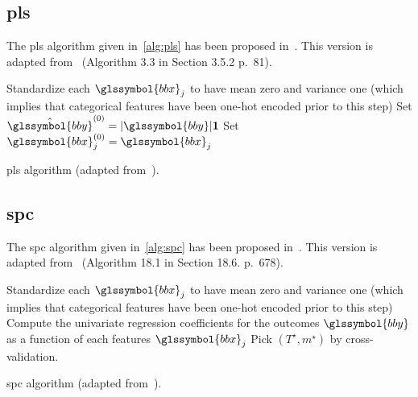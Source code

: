 \subsection{\gls{pls}} \label{app1:sec_pls}

The \gls{pls} algorithm given in~\eqref{alg:pls} has been proposed in~\cite{wold1984collinearity}. This version is adapted from~\cite{friedman2001elements} (Algorithm 3.3 in Section 3.5.2 p.\ 81).

\begin{algorithm}[H]
Standardize each $\glssymbol{bbx}_j$ to have mean zero and variance one (which implies that categorical features have been one-hot encoded prior to this step) \;
Set $\hat{\glssymbol{bby}}^{(0)} = |\glssymbol{bby}| \mathbf{1}$\;
Set $\glssymbol{bbx}_j^{(0)} = \glssymbol{bbx}_j$\;
 \caption{\label{alg:pls} \gls{pls} algorithm (adapted from~\cite{friedman2001elements}).}
\end{algorithm}


\subsection{\gls{spc}} \label{app1:sec_spc}

The \gls{spc} algorithm given in~\eqref{alg:spc} has been proposed in~\cite{bair2006prediction}. This version is adapted from~\cite{friedman2001elements} (Algorithm 18.1 in Section 18.6. p.\ 678).

\begin{algorithm}[H]
Standardize each $\glssymbol{bbx}_j$ to have mean zero and variance one (which implies that categorical features have been one-hot encoded prior to this step) \;
Compute the univariate regression coefficients for the outcomes $\glssymbol{bby}$ as a function of each features $\glssymbol{bbx}_j$\;
Pick $(T^\star, m^\star)$ by cross-validation.
 \caption{\label{alg:spc} \gls{spc} algorithm (adapted from~\cite{friedman2001elements}).}
\end{algorithm}

